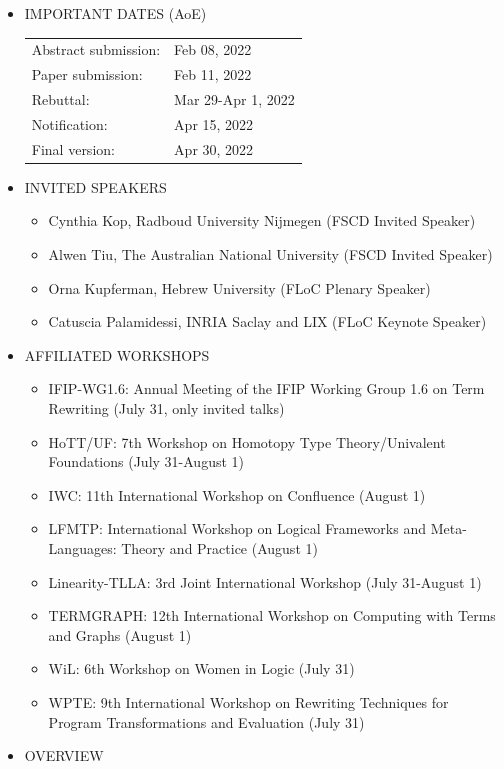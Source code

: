 \documentclass[prodmode,acmtecs]{acmsmall} %
\begin{document}
\begin{itemize}\item  IMPORTANT DATES (AoE) 
 
\begin{tabulary}{\linewidth}{LL}Abstract submission:  & Feb 08, 2022 \\
Paper submission:  & Feb 11, 2022 \\
Rebuttal:  & Mar 29-Apr 1, 2022 \\
Notification:  & Apr 15, 2022 \\
Final version:  & Apr 30, 2022 \\
\end{tabulary}
 
\item  INVITED SPEAKERS 
 
\begin{itemize}\item  Cynthia Kop, Radboud University Nijmegen (FSCD Invited Speaker)
\item  Alwen Tiu, The Australian National University (FSCD Invited Speaker)
\item  Orna Kupferman, Hebrew University (FLoC Plenary Speaker)
\item  Catuscia Palamidessi, INRIA Saclay and LIX (FLoC Keynote Speaker)
\end{itemize} 
\item  AFFILIATED WORKSHOPS   
 
\begin{itemize}\item  IFIP-WG1.6: Annual Meeting of the IFIP Working Group 1.6 on Term Rewriting (July 31, only invited talks)  
\item  HoTT/UF: 7th Workshop on Homotopy Type Theory/Univalent Foundations (July 31-August 1)  
\item  IWC: 11th International Workshop on Confluence (August 1)  
\item  LFMTP: International Workshop on Logical Frameworks and Meta-Languages: Theory and Practice (August 1)  
\item  Linearity-TLLA: 3rd Joint International Workshop (July 31-August 1)  
\item  TERMGRAPH: 12th International Workshop on Computing with Terms and Graphs (August 1)  
\item  WiL: 6th Workshop on Women in Logic (July 31)  
\item  WPTE: 9th International Workshop on Rewriting Techniques for Program Transformations and Evaluation (July 31)
\end{itemize} 
\item  OVERVIEW 
 

\end{itemize}
\end{document}
